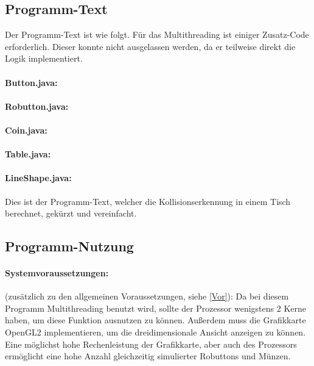 \subsection{Programm-Text}
Der Programm-Text ist wie folgt. Für das Multithreading ist einiger Zusatz-Code erforderlich.
Dieser konnte nicht ausgelassen werden, da er teilweise direkt die Logik implementiert.
\paragraph{Button.java:}
\lstset{language=Scala}
\lstset{basicstyle=\footnotesize}

\paragraph{Robutton.java:}

\paragraph{Coin.java:}

\paragraph{Table.java:}

\paragraph{LineShape.java:}
Dies ist der Programm-Text, welcher die Kollisionserkennung in einem Tisch berechnet, gekürzt und vereinfacht.

\subsection{Programm-Nutzung}
\paragraph{Systemvoraussetzungen:} (zusätzlich zu den allgemeinen Voraussetzungen, siehe \ref{Vor}):
Da bei diesem Programm Multithreading benutzt wird, sollte der Prozessor wenigstens 2 Kerne haben, um diese Funktion ausnutzen zu können.
Außerdem muss die Grafikkarte OpenGL2 implementieren, um die dreidimensionale Ansicht anzeigen zu können.
Eine möglichst hohe Rechenleistung der Grafikkarte, aber auch des Prozessors ermöglicht eine hohe Anzahl gleichzeitig simulierter Robuttons und Münzen.
